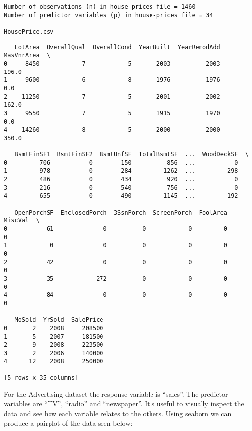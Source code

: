 \documentclass[11pt]{article}
\begin{document}
    \begin{Verbatim}[commandchars=\\\{\}]
Number of observations (n) in house-prices file = 1460
Number of predictor variables (p) in house-prices file = 34

HousePrice.csv

    \end{Verbatim}

    
    \begin{verbatim}
   LotArea  OverallQual  OverallCond  YearBuilt  YearRemodAdd  MasVnrArea  \
0     8450            7            5       2003          2003       196.0   
1     9600            6            8       1976          1976         0.0   
2    11250            7            5       2001          2002       162.0   
3     9550            7            5       1915          1970         0.0   
4    14260            8            5       2000          2000       350.0   

   BsmtFinSF1  BsmtFinSF2  BsmtUnfSF  TotalBsmtSF  ...  WoodDeckSF  \
0         706           0        150          856  ...           0   
1         978           0        284         1262  ...         298   
2         486           0        434          920  ...           0   
3         216           0        540          756  ...           0   
4         655           0        490         1145  ...         192   

   OpenPorchSF  EnclosedPorch  3SsnPorch  ScreenPorch  PoolArea  MiscVal  \
0           61              0          0            0         0        0   
1            0              0          0            0         0        0   
2           42              0          0            0         0        0   
3           35            272          0            0         0        0   
4           84              0          0            0         0        0   

   MoSold  YrSold  SalePrice  
0       2    2008     208500  
1       5    2007     181500  
2       9    2008     223500  
3       2    2006     140000  
4      12    2008     250000  

[5 rows x 35 columns]
    \end{verbatim}

    
    For the Advertising dataset the response variable is ``sales''. The
predictor variables are ``TV'', ``radio'' and ``newspaper''. It's useful
to visually inspect the data and see how each variable relates to the
others. Using seaborn we can produce a pairplot of the data seen below:
\end{document}
